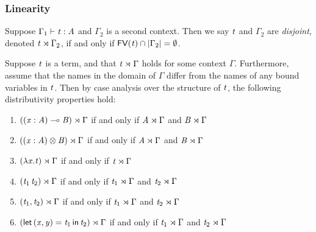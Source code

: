 
\subsubsection{Linearity}
\label{subsec:linearity}
\begin{definition}
  \label{def:disjointness}
  Suppose $\Gamma_{{\mathrm{1}}}  \vdash  \mathit{t}  :  \mathit{A}$ and $\Gamma_{{\mathrm{2}}}$ is a second context.  Then we
  say $\mathit{t}$ and $\Gamma_{{\mathrm{2}}}$ are \emph{disjoint}, denoted $\mathit{t}  \rtimes  \Gamma_{{\mathrm{2}}}$,
  if and only if $ \mathsf{FV}( \mathit{t} )  \cap |\Gamma_{{\mathrm{2}}}| = \emptyset$.
\end{definition}

\begin{lemma}
  \label{lemma:distributivity_of_disjointness}
  Suppose $\mathit{t}$ is a term, and that $\mathit{t}  \rtimes  \Gamma$
  holds for some context $\Gamma$.  Furthermore, assume that the names
  in the domain of $\Gamma$ differ from the names of any bound
  variables in $\mathit{t}$.  Then by case analysis over the structure of
  $\mathit{t}$, the following distributivity properties hold:
  \begin{enumerate}[label=\roman*.]
  \item $(  (  \mathit{x}  :  \mathit{A}  )  \multimap  \mathit{B}  )  \rtimes  \Gamma$ if and only if $\mathit{A}  \rtimes  \Gamma$ and $\mathit{B}  \rtimes  \Gamma$
  \item $(  (  \mathit{x}  :  \mathit{A}  )  \otimes  \mathit{B}  )  \rtimes  \Gamma$ if and only if $\mathit{A}  \rtimes  \Gamma$ and $\mathit{B}  \rtimes  \Gamma$  
  \item $(   \lambda  \mathit{x}  .  \mathit{t}   )  \rtimes  \Gamma$ if and only if $\mathit{t}  \rtimes  \Gamma$
  \item $(  \mathit{t_{{\mathrm{1}}}} \, \mathit{t_{{\mathrm{2}}}}  )  \rtimes  \Gamma$ if and only if $\mathit{t_{{\mathrm{1}}}}  \rtimes  \Gamma$ and $\mathit{t_{{\mathrm{2}}}}  \rtimes  \Gamma$
  \item $(  \mathit{t_{{\mathrm{1}}}}  ,  \mathit{t_{{\mathrm{2}}}}  )  \rtimes  \Gamma$ if and only if $\mathit{t_{{\mathrm{1}}}}  \rtimes  \Gamma$ and $\mathit{t_{{\mathrm{2}}}}  \rtimes  \Gamma$
  \item $(   \mathsf{let}\,( \mathit{x} , \mathit{y} ) =  \mathit{t_{{\mathrm{1}}}} \,\mathsf{in}\, \mathit{t_{{\mathrm{2}}}}   )  \rtimes  \Gamma$ if and only if $\mathit{t_{{\mathrm{1}}}}  \rtimes  \Gamma$ and $\mathit{t_{{\mathrm{2}}}}  \rtimes  \Gamma$
  \end{enumerate}
\end{lemma}

